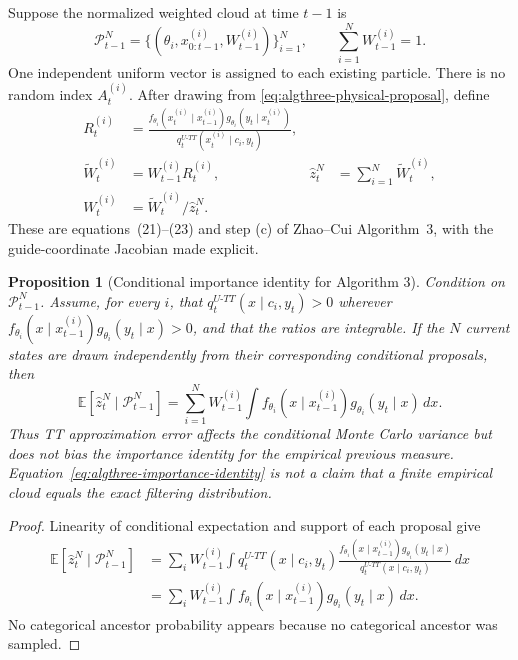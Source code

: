 \documentclass[11pt]{article}
\newtheorem{proposition}{Proposition}
\begin{document}
Suppose the normalized weighted cloud at time $t-1$ is
\begin{equation}
 \mathcal P_{t-1}^N
 =\bigl\{(\theta_i,x_{0:t-1}^{(i)},W_{t-1}^{(i)})\bigr\}_{i=1}^N,
 \qquad \sum_{i=1}^NW_{t-1}^{(i)}=1.
 \label{eq:algthree-input-cloud}
\end{equation}
One independent uniform vector is assigned to each existing particle.  There
is no random index $A_t^{(i)}$.  After drawing from
\eqref{eq:algthree-physical-proposal}, define
\begin{align}
 R_t^{(i)}
 &=\frac{f_{\theta_i}(x_t^{(i)}\mid x_{t-1}^{(i)})
          g_{\theta_i}(y_t\mid x_t^{(i)})}
         {q_t^{U\text{-}TT}(x_t^{(i)}\mid c_i,y_t)},
 \label{eq:algthree-ratio}\\
 \widetilde W_t^{(i)}
 &=W_{t-1}^{(i)}R_t^{(i)},
 &\widehat z_t^N&=\sum_{i=1}^N\widetilde W_t^{(i)},
 \label{eq:algthree-unnormalized-weight}\\
 W_t^{(i)}&=\widetilde W_t^{(i)}/\widehat z_t^N.
 \label{eq:algthree-normalized-weight}
\end{align}
These are equations~(21)--(23) and step (c) of Zhao--Cui Algorithm~3, with the
guide-coordinate Jacobian made explicit.

\begin{proposition}[Conditional importance identity for Algorithm 3]
\label{prop:algthree-importance}
Condition on $\mathcal P_{t-1}^N$.  Assume, for every $i$, that
$q_t^{U\text{-}TT}(x\mid c_i,y_t)>0$ wherever
$f_{\theta_i}(x\mid x_{t-1}^{(i)})g_{\theta_i}(y_t\mid x)>0$, and that the
ratios are integrable.  If the $N$ current states are drawn independently from
their corresponding conditional proposals, then
\begin{equation}
 \mathbb E\!\left[\widehat z_t^N\mid\mathcal P_{t-1}^N\right]
 =\sum_{i=1}^NW_{t-1}^{(i)}
   \int f_{\theta_i}(x\mid x_{t-1}^{(i)})
        g_{\theta_i}(y_t\mid x)\,dx.
 \label{eq:algthree-importance-identity}
\end{equation}
Thus TT approximation error affects the conditional Monte Carlo variance but
does not bias the importance identity for the empirical previous measure.
Equation~\eqref{eq:algthree-importance-identity} is not a claim that a finite
empirical cloud equals the exact filtering distribution.
\end{proposition}

\begin{proof}
Linearity of conditional expectation and support of each proposal give
\begin{align*}
 \mathbb E[\widehat z_t^N\mid\mathcal P_{t-1}^N]
 &=\sum_iW_{t-1}^{(i)}
   \int q_t^{U\text{-}TT}(x\mid c_i,y_t)
   \frac{f_{\theta_i}(x\mid x_{t-1}^{(i)})g_{\theta_i}(y_t\mid x)}
        {q_t^{U\text{-}TT}(x\mid c_i,y_t)}\,dx\\
 &=\sum_iW_{t-1}^{(i)}
   \int f_{\theta_i}(x\mid x_{t-1}^{(i)})g_{\theta_i}(y_t\mid x)\,dx.
\end{align*}
No categorical ancestor probability appears because no categorical ancestor
was sampled.
\end{proof}
\end{document}
